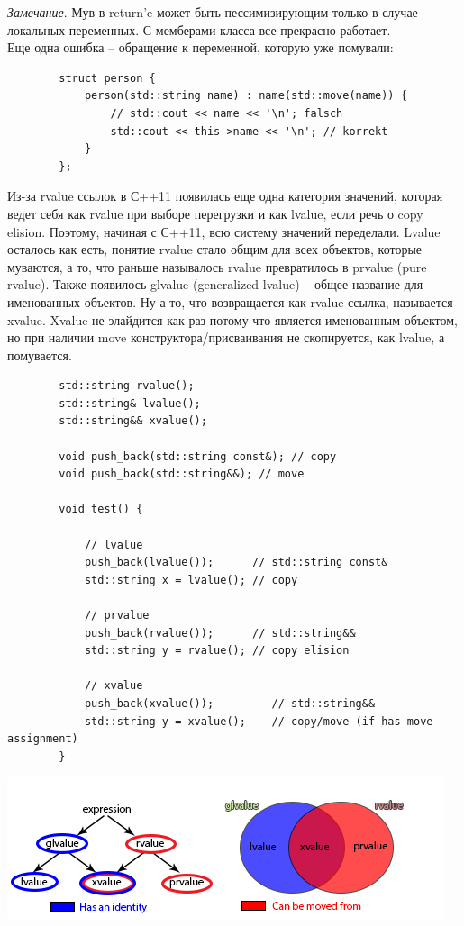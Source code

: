 \documentclass[12pt, a4paper]{article}
\begin{document}
	\textit{Замечание}. Мув в return'e может быть пессимизирующим только в случае локальных переменных. С мемберами класса все прекрасно работает.\\
	Еще одна ошибка -- обращение к переменной, которую уже помували:
	\begin{verbatim}
		struct person {
			person(std::string name) : name(std::move(name)) {
				// std::cout << name << '\n'; falsch
				std::cout << this->name << '\n'; // korrekt
			}
		};
	\end{verbatim}
	Из-за rvalue ссылок в С++11 появилась еще одна категория значений, которая ведет себя как rvalue при выборе перегрузки и как lvalue, если речь о copy elision. Поэтому, начиная с С++11, всю систему значений переделали. Lvalue осталось как есть, понятие rvalue стало общим для всех объектов, которые муваются, а то, что раньше называлось rvalue превратилось в prvalue (pure rvalue). Также появилось glvalue (generalized lvalue) -- общее название для именованных объектов. Ну а то, что возвращается как rvalue ссылка, называется xvalue. Xvalue не элайдится как раз потому что является именованным объектом, но при наличии move конструктора/присваивания не скопируется, как lvalue, а помувается. 
	\begin{verbatim}
		std::string rvalue();
		std::string& lvalue();
		std::string&& xvalue();
		
		void push_back(std::string const&); // copy
		void push_back(std::string&&); // move
		
		void test() {
			
			// lvalue
			push_back(lvalue());      // std::string const&
			std::string x = lvalue(); // copy
			
			// prvalue 
			push_back(rvalue());      // std::string&&
			std::string y = rvalue(); // copy elision
			
			// xvalue
			push_back(xvalue());         // std::string&&
			std::string y = xvalue();    // copy/move (if has move assignment)
		}
	\end{verbatim}
	\includegraphics[scale=0.9]{value_categories.png}\\
\end{document}
